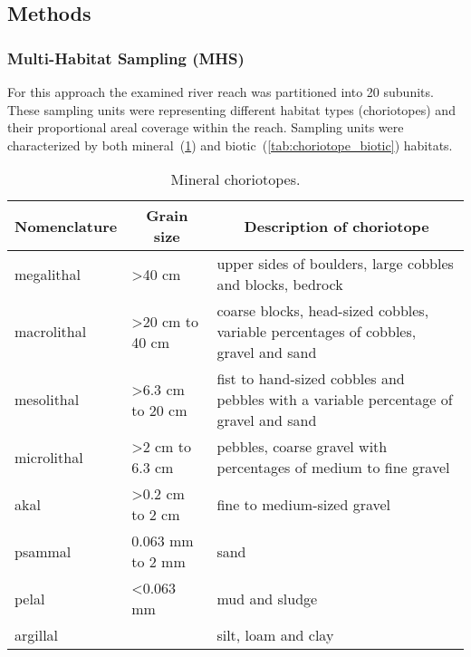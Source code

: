 \subsection{Methods}\label{sec:methods}                         %

\subsubsection{Multi-Habitat Sampling (MHS)}\label{sec:mhs}         %


For this approach the examined river reach was partitioned into 20 subunits. These sampling units were representing different habitat types (choriotopes) and their proportional areal coverage within the reach. Sampling units were characterized by both mineral~(\cref{tab:choriotope_mineral}) and biotic~(\cref{tab:choriotope_biotic}) habitats.


\begin{table}[!htb]                                 %
  \small                                                       %
  \centering
  \caption{Mineral choriotopes.}
    \begin{tabular}{ l l p{7cm} }
  \toprule
    Nomenclature  &
    \multicolumn{1}{c}{Grain size}  &
    \multicolumn{1}{c}{Description of choriotope} \\
  \hline
  \hline
    megalithal      & \textgreater 40 cm               & upper sides of boulders, large cobbles and blocks, bedrock\\
    macrolithal     & \textgreater 20 cm to 40 cm      & coarse blocks, head-sized cobbles, variable percentages of cobbles, gravel and sand\\
    mesolithal      & \textgreater 6.3 cm to 20 cm     & fist to hand-sized cobbles and pebbles with a variable percentage of gravel and sand\\
    microlithal     & \textgreater 2 cm to 6.3 cm      & pebbles, coarse gravel with percentages of medium to fine gravel\\
    akal            & \textgreater 0.2 cm to 2 cm      & fine to medium-sized gravel\\
    psammal         & 0.063 mm to 2 mm      & sand\\
    pelal           & \textless 0.063 mm            & mud and sludge\\
    argillal        &                       & silt, loam and clay\\
  \bottomrule
    \end{tabular}
  \label{tab:choriotope_mineral}%
\end{table}%


